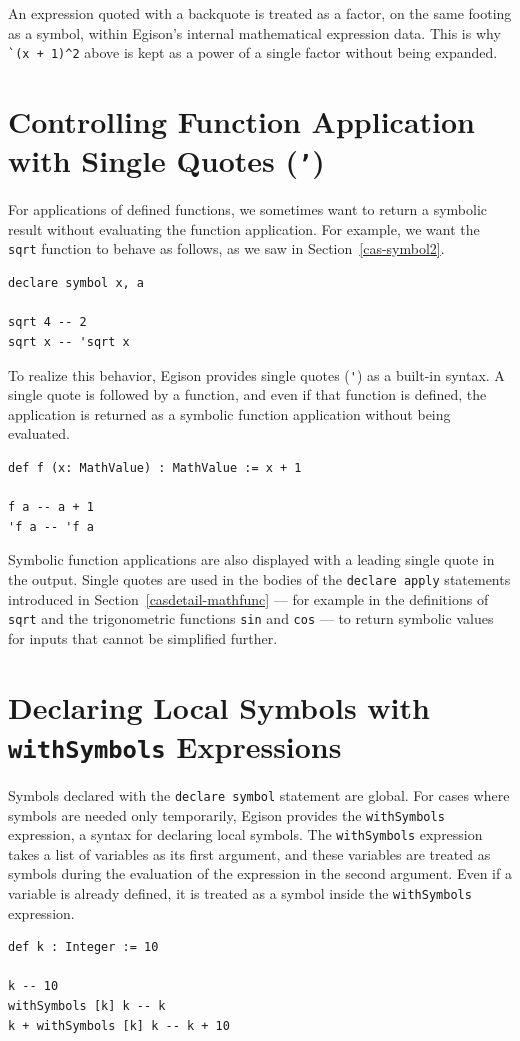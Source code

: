An expression quoted with a backquote is treated as a factor, on the same footing as a symbol, within Egison's internal mathematical expression data.
This is why \lstinline{`(x + 1)^2} above is kept as a power of a single factor without being expanded.

\section{Controlling Function Application with Single Quotes (\texttt{'})}\label{mexpr-squote}

For applications of defined functions, we sometimes want to return a symbolic result without evaluating the function application.
For example, we want the \lstinline{sqrt} function to behave as follows, as we saw in Section~\ref{cas-symbol2}.
\begin{lstlisting}[language=egison,numbers=none]
declare symbol x, a

sqrt 4 -- 2
sqrt x -- 'sqrt x
\end{lstlisting}
To realize this behavior, Egison provides single quotes (\lstinline{'}) as a built-in syntax.
A single quote is followed by a function, and even if that function is defined, the application is returned as a symbolic function application without being evaluated.
\begin{lstlisting}[language=egison,numbers=none]
def f (x: MathValue) : MathValue := x + 1

f a -- a + 1
'f a -- 'f a
\end{lstlisting}
Symbolic function applications are also displayed with a leading single quote in the output.
Single quotes are used in the bodies of the \lstinline{declare apply} statements introduced in Section~\ref{casdetail-mathfunc} --- for example in the definitions of \lstinline{sqrt} and the trigonometric functions \lstinline{sin} and \lstinline{cos} --- to return symbolic values for inputs that cannot be simplified further.

\section{Declaring Local Symbols with \texttt{withSymbols} Expressions}\label{mexpr-withsym}

Symbols declared with the \lstinline{declare symbol} statement are global.
For cases where symbols are needed only temporarily, Egison provides the \lstinline{withSymbols} expression, a syntax for declaring local symbols.
The \lstinline{withSymbols} expression takes a list of variables as its first argument, and these variables are treated as symbols during the evaluation of the expression in the second argument.
Even if a variable is already defined, it is treated as a symbol inside the \lstinline{withSymbols} expression.
\begin{lstlisting}[language=egison,numbers=none]
def k : Integer := 10

k -- 10
withSymbols [k] k -- k
k + withSymbols [k] k -- k + 10
\end{lstlisting}

